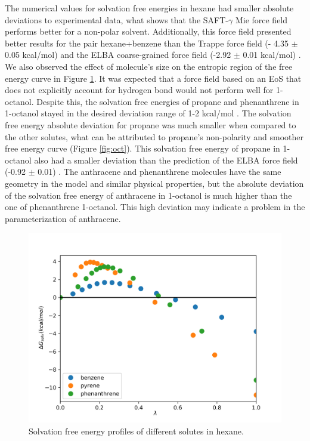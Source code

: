 The numerical values for solvation free energies in hexane had smaller absolute deviations to experimental data, what shows that the SAFT-$\gamma$ Mie force field performs better for a non-polar solvent. Additionally, this force field presented better results for the pair hexane+benzene than the Trappe force field (- 4.35  $\pm$ 0.05 kcal/mol) \cite{garrido2011} and the ELBA coarse-grained force field  (-2.92 $\pm$ 0.01 kcal/mol) \cite{doi:10.1021/acs.jctc.5b00963}. We also observed the effect of molecule's size on the entropic region of the free energy curve in Figure \ref{fig:hex}. It was expected that a force field based on an EoS that does not explicitly account for hydrogen bond would not perform well for 1-octanol. Despite this, the solvation free energies of propane and phenanthrene in 1-octanol stayed in the desired deviation range of 1-2 kcal/mol \cite{doimobley}. The solvation free energy absolute deviation for propane was much smaller when compared to the other solutes, what can be attributed to propane's non-polarity and smoother free energy curve (Figure \ref{fig:oct}). This solvation free energy of propane in 1-octanol also had a smaller deviation than the prediction of the ELBA force field (-0.92 $\pm$ 0.01) \cite{doi:10.1021/acs.jctc.5b00963}. The anthracene and phenanthrene molecules have the same geometry in the model and similar physical properties, but the absolute deviation of the solvation free energy of anthracene in 1-octanol is much higher than the one of phenanthrene 1-octanol. This high deviation may indicate a problem in the parameterization of anthracene.      

\begin{figure}[H]
\centering
\includegraphics[width=0.9\linewidth]{Figures/hex}
\caption{Solvation free energy profiles of different solutes in hexane.}
\label{fig:hex}
\end{figure}

